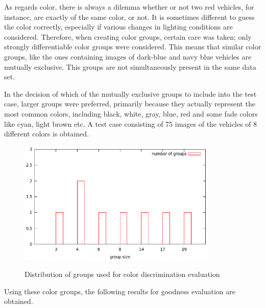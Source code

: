 \documentclass[times, utf8, zavrsni]{fer}
\begin{document}
As regards color, there is always a dilemma whether or not two red vehicles, for
instance, are exactly of the same color, or not. It is sometimes different to
guess the color correctly, especially if various changes in lighting conditions
are considered. Therefore, when creating color groups, certain care was taken;
only strongly differentiable color groups were considered. This means that
similar color groups, like the ones containing images of dark-blue and navy blue
vehicles are mutually exclusive. This groups are not simultaneously present in
the same data set.

In the decision of which of the mutually exclusive groups to include into the
test case, larger groups were preferred, primarily because they actually
represent the most common colors, including black, white, gray, blue, red and
some fade colors like cyan, light brown etc. A test case consisting of 75
images of the vehicles of 8 different colors is obtained.

\begin{figure}[htb]
\centering
\includegraphics[width=0.85\textwidth]{images/color-group-distribution}
\label{fig:color-group-distribution}
\caption{Distribution of groups used for color discrimination evaluation}
\end{figure}

Using these color groups, the following results for goodness evaluation are
obtained.
\end{document}

